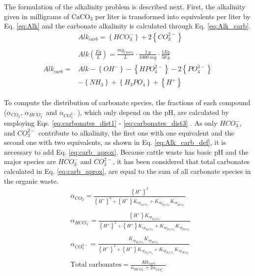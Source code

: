\documentclass[10pt,a4paper]{article}
\begin{document}
The formulation of the alkalinity problem is described next. First, the alkalinity given in milligrams of $\text{CaCO}_{3}$ per liter is transformed into equivalents per liter by Eq. \ref{eq:Alk} and the carbonate alkalinity is calculated through Eq. \ref{eq:Alk_carb}.
\begin{align}
&  Alk_{carb}= \left\{HCO_{3}^{-}\right\} + 2\left\{CO_{3}^{2-}\right\} \label{eq:Alk_carb_def}\\
\nonumber \\
& Alk \left(\frac{Eq}{L}\right) = \frac{mg_{CacO_{3}}}{L} \cdot \frac{1 \ g}{1000 \ mg} \cdot \frac{1 Eq}{50 \ g} \label{eq:Alk}
\end{align}
\begin{align}
\begin{split}
Alk_{carb}=&Alk-\left\{ OH^{-} \right\}-\left\{ HPO_{4}^{2-} \right\}- 2\left\{ PO_{4}^{3-}\right\} \\&-\left\{ NH_{3} \right\}+\left\{ H_{3}PO_{4} \right\}+\left\{ H^{+} \right\} \label{eq:Alk_carb}
\end{split}
\end{align}

To compute the distribution of carbonate species, the fractions of each compound ($\alpha_{CO_2}$, $\alpha_{HCO_{3}^{-}}$ and $\alpha_{CO_{3}^{2-}}$), which only depend on the pH, are calculated by employing Eqs. \ref{eq:carbonates_dist1} - \ref{eq:carbonates_dist3} . As only $HCO_{3}^{-}$, and $CO_{3}^{2-}$ contribute to alkalinity, the first one with one equivalent and the second one with two equivalents, as shown in Eq. \ref{eq:Alk_carb_def}, it is necessary  to add Eq. \ref{eq:carb_aprox}. Because cattle waste has basic pH and the major species are $HCO_{3}^{-}$ and $CO_{3}^{2-}$, it has been considered that total carbonates calculated in Eq. \ref{eq:carb_aprox}, are equal to the sum of all carbonate species in the organic waste.
\begin{align}
& \alpha_{CO_2} = \frac{\left\{ H^{+} \right\}^{2}}{\left\{ H^{+} \right\}^{2} + \left\{ H^{+} \right\}K_{sp_{H_{2}CO_{3}}}+K_{sp_{H_{2}CO_{3}}}K_{sp_{HCO_{3}^{-}}}} \label{eq:carbonates_dist1} \\
\nonumber \\
& \alpha_{HCO_{3}^{-}} = \frac{\left\{ H^{+} \right\}K_{sp_{H_{2}CO_{3}}}}{\left\{ H^{+} \right\}^{2} + \left\{ H^{+} \right\}K_{sp_{H_{2}CO_{3}}}+K_{sp_{H_{2}CO_{3}}}K_{sp_{HCO_{3}^{-}}}} \label{eq:carbonates_dist2} \\ 
\nonumber \\
& \alpha_{CO_{3}^{2-}} = \frac{K_{sp_{H_{2}CO_{3}}}K_{sp_{HCO_{3}^{-}}}}{\left\{ H^{+} \right\}^{2} + \left\{ H^{+} \right\}K_{sp_{H_{2}CO_{3}}}+K_{sp_{H_{2}CO_{3}}}K_{sp_{HCO_{3}^{-}}}} \label{eq:carbonates_dist3} \\
\nonumber \\
& \text{Total carbonates} = \frac{Alk_{carb}}{\alpha_{HCO_{3}^{-}} + 2 \alpha_{CO_{3}^{2-}}} \label{eq:carb_aprox}
\end{align}
\end{document}
